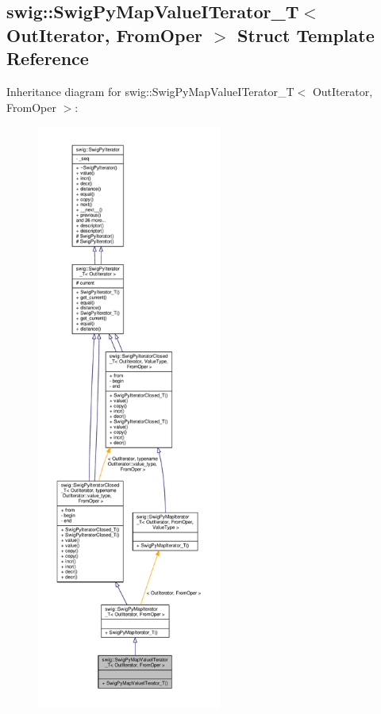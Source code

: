 \subsection{swig\+:\+:Swig\+Py\+Map\+Value\+I\+Terator\+\_\+T$<$ Out\+Iterator, From\+Oper $>$ Struct Template Reference}
\label{structswig_1_1SwigPyMapValueITerator__T}


Inheritance diagram for swig\+:\+:Swig\+Py\+Map\+Value\+I\+Terator\+\_\+T$<$ Out\+Iterator, From\+Oper $>$\+:
\nopagebreak
\begin{figure}[H]
\begin{center}
\leavevmode
\includegraphics[height=550pt]{df/d06/structswig_1_1SwigPyMapValueITerator__T__inherit__graph}
\end{center}
\end{figure}


